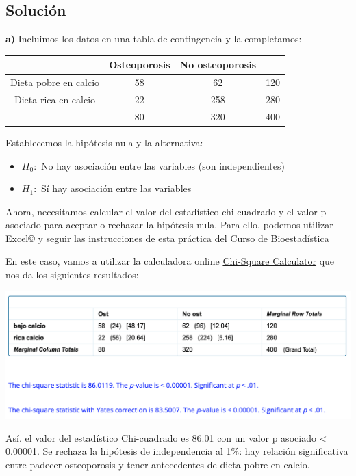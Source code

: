 \documentclass[
]{book}
\providecommand{\tightlist}{%
  \setlength{\itemsep}{0pt}\setlength{\parskip}{0pt}}
\begin{document}
\hypertarget{soluciuxf3n-11}{%
\subsection{Solución}\label{soluciuxf3n-11}}

\textbf{a)} Incluimos los datos en una tabla de contingencia y la completamos:

\begin{longtable}[]{@{}cccc@{}}
\toprule
& Osteoporosis & No osteoporosis &\tabularnewline
\midrule
\endhead
Dieta pobre en calcio & 58 & 62 & 120\tabularnewline
Dieta rica en calcio & 22 & 258 & 280\tabularnewline
& 80 & 320 & 400\tabularnewline
\bottomrule
\end{longtable}

Establecemos la hipótesis nula y la alternativa:

\begin{itemize}
\tightlist
\item
  \(H_0:\) No hay asociación entre las variables (son independientes)
\item
  \(H_1:\) Sí hay asociación entre las variables
\end{itemize}

Ahora, necesitamos calcular el valor del estadístico chi-cuadrado y el valor p asociado para aceptar o rechazar la hipótesis nula. Para ello, podemos utilizar Excel© y seguir las instrucciones de \href{https://1fjmanzano.github.io/bioestadistica/me\%CC\%81todos-de-inferencia-estadi\%CC\%81stica.html\#prueba-chi2-pr\%C3\%A1ctica}{esta práctica del Curso de Bioestadística}

En este caso, vamos a utilizar la calculadora online \href{https://www.socscistatistics.com/tests/chisquare/default2.aspx}{Chi-Square Calculator} que nos da los siguientes resultados:

\includegraphics[width=20.11in]{img/5_1}

Así. el valor del estadístico Chi-cuadrado es 86.01 con un valor p asociado \textless{} 0.00001. Se rechaza la hipótesis de independencia al 1\%: hay relación significativa entre padecer osteoporosis y tener antecedentes de dieta pobre en calcio.
\end{document}
